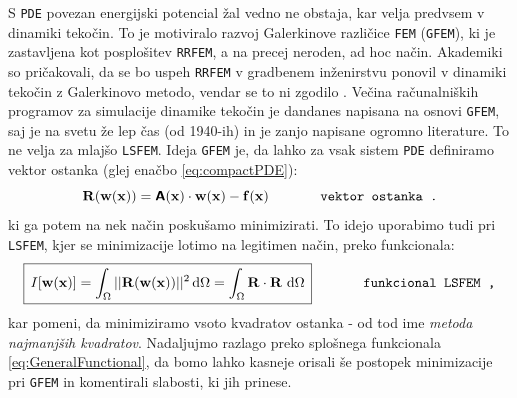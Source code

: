 S \texttt{PDE} povezan energijski potencial žal vedno ne obstaja, kar velja predvsem v dinamiki tekočin. To je motiviralo razvoj Galerkinove različice \texttt{FEM} (\texttt{GFEM}), ki je zastavljena kot posplošitev \texttt{RRFEM}, a na precej neroden, ad hoc način. Akademiki so pričakovali, da se bo uspeh \texttt{RRFEM} v gradbenem inženirstvu ponovil v dinamiki tekočin z Galerkinovo metodo, vendar se to ni zgodilo \cite{JiangB-LSFEM}. Večina računalniških programov za simulacije dinamike tekočin je dandanes napisana na osnovi \texttt{GFEM}, saj je na svetu že lep čas (od 1940-ih) in je zanjo napisane ogromno literature. To ne velja za mlajšo \texttt{LSFEM}. Ideja \texttt{GFEM} je, da lahko za vsak sistem \texttt{PDE} definiramo vektor ostanka (glej enačbo \eqref{eq:compactPDE}):
\begin{equation}
	\mathbf{R(w(x))} = \bm{\mathsf{A}}(\mathbf{x}) \cdot \mathbf{w(x)} - \mathbf{f(x)} \hspace{1.3cm} \texttt{vektor ostanka .}
	\label{eq:residual}
\end{equation}
ki ga potem na nek način poskušamo minimizirati. To idejo uporabimo tudi pri \texttt{LSFEM}, kjer se minimizacije lotimo na legitimen način, preko funkcionala:
\begin{equation}
	\boxed{\, I[\mathbf{w(x)}] = \int_{\Omega} ||\mathbf{R(w(x))}||^2 \, \ud \Omega = \int_{\Omega}\mathbf{R \cdot R} \ \ud \Omega \,} \hspace{1.3cm} \texttt{funkcional LSFEM ,}
\end{equation}
kar pomeni, da minimiziramo vsoto kvadratov ostanka - od tod ime \emph{metoda najmanjših kvadratov}. Nadaljuj\-mo razlago preko splošnega funkcionala \eqref{eq:GeneralFunctional}, da bomo lahko kasneje orisali še postopek minimizacije pri \texttt{GFEM} in komentirali slabosti, ki jih prinese.

